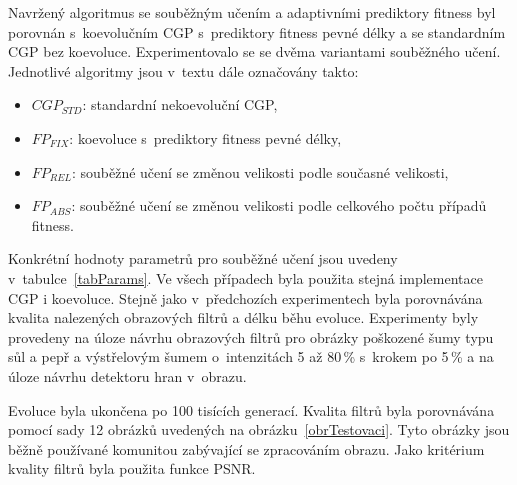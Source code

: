 Navržený algoritmus se souběžným učením a adaptivními prediktory fitness byl porovnán s~koevolučním CGP s~prediktory fitness pevné délky a se standardním CGP bez koevoluce. Experimentovalo se se dvěma variantami souběžného učení. Jednotlivé algoritmy jsou v~textu dále označovány takto:

\begin{itemize}
    \item $\mathit{CGP_{STD}}$: standardní nekoevoluční CGP,
    \item $\mathit{FP_{FIX}}$: koevoluce s~prediktory fitness pevné délky,
    \item $\mathit{FP_{REL}}$: souběžné učení se změnou velikosti podle současné velikosti,
    \item $\mathit{FP_{ABS}}$: souběžné učení se změnou velikosti podle celkového počtu případů fitness.
\end{itemize}

Konkrétní hodnoty parametrů pro souběžné učení jsou uvedeny v~tabulce~\ref{tabParams}. Ve všech případech byla použita stejná implementace CGP i koevoluce. Stejně jako v~předchozích experimentech byla porovnávána kvalita nalezených obrazových filtrů a délku běhu evoluce. Experimenty byly provedeny na úloze návrhu obrazových filtrů pro obrázky poškozené šumy typu sůl a pepř a výstřelovým šumem o~intenzitách 5 až 80\,\% s~krokem po 5\,\% a na úloze návrhu detektoru hran v~obrazu.

Evoluce byla ukončena po 100 tisících generací. Kvalita filtrů byla porovnávána pomocí sady 12 obrázků uvedených na obrázku~\ref{obrTestovaci}. Tyto obrázky jsou běžně používané komunitou zabývající se zpracováním obrazu. Jako kritérium kvality filtrů byla použita funkce PSNR.

